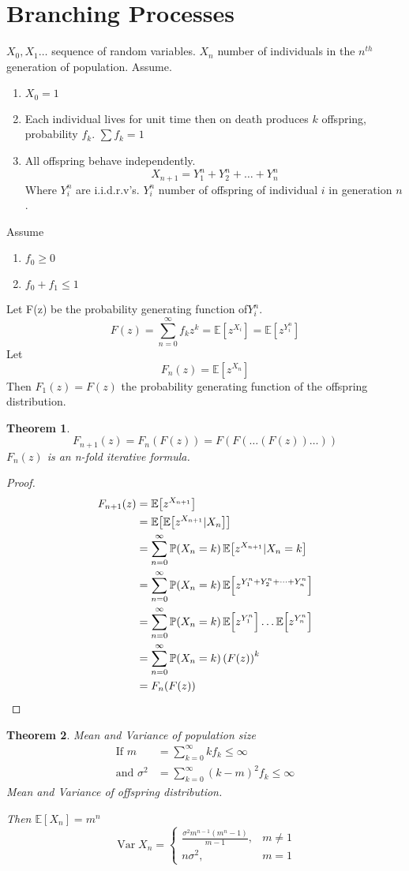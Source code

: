 \documentclass{notes}
\theoremstyle{plain}
\newtheorem{theorem}{Theorem}[chapter]
\newcommand{\bP}{\mathbb{P}}
\newcommand{\bE}{\mathbb{E}}
\newcommand{\prob}[1]{\bP \negthinspace\left(#1\right)}
\newcommand{\expect}[1]{\bE\!\left[#1\right]}
\DeclareMathOperator{\var}{Var}
\begin{document}
\section{Branching Processes}
\vspace{3in}
$X_0,X_1\dots$ sequence of random variables. $X_n$ number of
individuals in the  $n^{th}$ generation of population.
Assume.
\begin{enumerate}
\item $X_0 = 1$
\item Each individual lives for unit time then on death produces $k$ offspring, 
probability $f_k$. $\sum f_k = 1$
\item All offspring behave independently.
\[
X_{n+1} = Y_1^n +Y_2^n+ \dots+ Y_n^n
\]
Where $Y_i^n$ are i.i.d.r.v's. $ Y_i^n$ number of offspring of
individual $i$  in generation $n$.
\end{enumerate}
Assume
\begin{enumerate}
\item $f_0 \ge 0$
\item $f_0+f_1 \le 1$
\end{enumerate}
Let F(z) be the probability generating function of$ Y_i^n$.
\[
F(z) = \sum_{n=0}^\infty f_k z^k = \expect{z^{X_i}} = \expect{z^{ Y_i^n}}
\]
Let 
\[
F_n(z) = \expect{z^{X_n}}
\]
Then $F_1(z) = F(z)$ the probability generating function of the offspring 
distribution.
\begin{theorem}
\[
F_{n+1}(z) = F_n(F(z)) = F(F(\dots(F(z))\dots))
\]
$F_n(z)$ is an n-fold iterative formula.
\end{theorem}
\begin{proof}
\begin{align*}
F_{n+1}(z) &= \expect{z^{X_{n+1}}}\\
&= \expect{\expect{z^{X_{n+1}}|X_n}}\\
&=\sum_{n=0}^\infty \prob{X_n = k}\expect{z^{X_{n+1}}|X_n=k}\\
&=\sum_{n=0}^\infty \prob{X_n = k}\expect{z^{Y_1^n + Y_2^n+\dots+ Y_n^n}}\\
&= \sum_{n=0}^\infty \prob{X_n = k}\expect{z^{Y_1^n}}\dots\expect{z^{Y_n^n}}\\
&= \sum_{n=0}^\infty \prob{X_n = k} \left(F(z)\right)^k\\
&=F_n(F(z))
\end{align*}
\end{proof}
\begin{theorem} Mean and Variance of population size
\begin{align*}
\text{If } m &= \sum_{k=0}^\infty kf_k \le \infty\\
\text{and } \sigma^2 &=   \sum_{k=0}^\infty (k-m)^2 f_k  \le \infty
\end{align*}
Mean and Variance of offspring distribution.

Then  $\expect{X_n} = m^n$
\begin{equation}
\var X_n = 
\begin{cases}
\frac{\sigma^2m^{n-1}(m^n-1)}{m-1},  &\text{$m\neq1$}\\
n\sigma^2, &\text{$m=1$}
\end{cases}
\end{equation}
\end{theorem}
\end{document}
